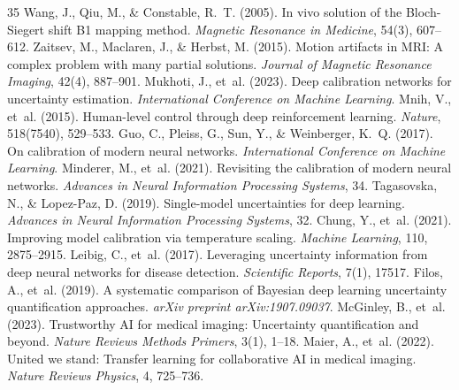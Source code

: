 \documentclass[11pt,a4paper]{article}
\begin{document}
\begin{thebibliography}{35}
 Wang, J., Qiu, M., \& Constable, R.~T. (2005). In vivo solution of the Bloch-Siegert shift B1 mapping method. \emph{Magnetic Resonance in Medicine}, 54(3), 607--612.
 Zaitsev, M., Maclaren, J., \& Herbst, M. (2015). Motion artifacts in MRI: A complex problem with many partial solutions. \emph{Journal of Magnetic Resonance Imaging}, 42(4), 887--901.
 Mukhoti, J., et~al. (2023). Deep calibration networks for uncertainty estimation. \emph{International Conference on Machine Learning}.
 Mnih, V., et~al. (2015). Human-level control through deep reinforcement learning. \emph{Nature}, 518(7540), 529--533.
 Guo, C., Pleiss, G., Sun, Y., \& Weinberger, K.~Q. (2017). On calibration of modern neural networks. \emph{International Conference on Machine Learning}.
 Minderer, M., et~al. (2021). Revisiting the calibration of modern neural networks. \emph{Advances in Neural Information Processing Systems}, 34.
 Tagasovska, N., \& Lopez-Paz, D. (2019). Single-model uncertainties for deep learning. \emph{Advances in Neural Information Processing Systems}, 32.
 Chung, Y., et~al. (2021). Improving model calibration via temperature scaling. \emph{Machine Learning}, 110, 2875--2915.
 Leibig, C., et~al. (2017). Leveraging uncertainty information from deep neural networks for disease detection. \emph{Scientific Reports}, 7(1), 17517.
 Filos, A., et~al. (2019). A systematic comparison of Bayesian deep learning uncertainty quantification approaches. \emph{arXiv preprint arXiv:1907.09037}.
 McGinley, B., et~al. (2023). Trustworthy AI for medical imaging: Uncertainty quantification and beyond. \emph{Nature Reviews Methods Primers}, 3(1), 1--18.
 Maier, A., et~al. (2022). United we stand: Transfer learning for collaborative AI in medical imaging. \emph{Nature Reviews Physics}, 4, 725--736.
\end{thebibliography}
\end{document}

